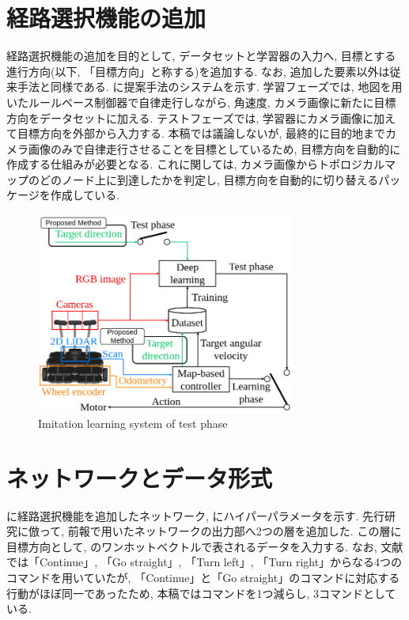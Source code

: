 \documentclass{jarticle}
\begin{document}
\section{経路選択機能の追加}
経路選択機能の追加を目的として, データセットと学習器の入力へ, 目標とする進行方向(以下, 「目標方向」と称する)を追加する. なお, 追加した要素以外は従来手法と同様である. に提案手法のシステムを示す. 学習フェーズでは, 地図を用いたルールベース制御器で自律走行しながら, 角速度, カメラ画像に新たに目標方向をデータセットに加える. テストフェーズでは, 学習器にカメラ画像に加えて目標方向を外部から入力する. 本稿では議論しないが, 最終的に目的地までカメラ画像のみで自律走行させることを目標としているため, 目標方向を自動的に作成する仕組みが必要となる. これに関しては, カメラ画像からトポロジカルマップのどのノード上に到達したかを判定し, 目標方向を自動的に切り替えるパッケージを作成している.

\begin{figure}[h]
  \centering
   \includegraphics[width=85mm]{system2.png}
   \vspace*{-4mm}
   \caption{Imitation learning system of test phase}
   \label{fig: fig3}
 \end{figure}

\section{ネットワークとデータ形式}
に経路選択機能を追加したネットワーク, にハイパーパラメータを示す. 
先行研究に倣って, 前報で用いたネットワークの出力部へ2つの層を追加した. この層に目標方向として, のワンホットベクトルで表されるデータを入力する. なお, 文献\cite{mech}では「Continue」, 「Go straight」, 「Turn left」, 「Turn right」からなる4つのコマンドを用いていたが, 「Continue」と「Go straight」のコマンドに対応する行動がほぼ同一であったため, 本稿ではコマンドを1つ減らし, 3コマンドとしている. 
\end{document}
